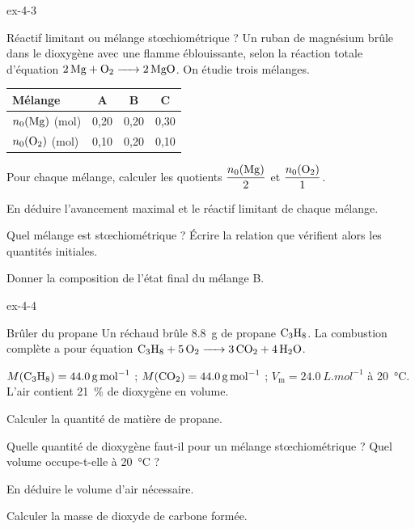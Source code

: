 \begin{blocLivre}{ex-4-3}
\begin{exercice}[1]{Réactif limitant ou mélange stœchiométrique ?}
Un ruban de magnésium brûle dans le dioxygène avec une flamme éblouissante, selon la réaction totale d'équation
$\ce{2Mg + O2 -> 2MgO}$. On étudie trois mélanges.
\par\smallskip\noindent\hfill\begin{tabular}{lccc}
\toprule
Mélange & A & B & C \\
\midrule
$n_0(\ce{Mg})$ (\unit{mol}) & 0,20 & 0,20 & 0,30 \\
$n_0(\ce{O2})$ (\unit{mol}) & 0,10 & 0,20 & 0,10 \\
\bottomrule
\end{tabular}\hfill\null\par\smallskip
\begin{questions}
\item Pour chaque mélange, calculer les quotients $\dfrac{n_0(\ce{Mg})}{2}$ et $\dfrac{n_0(\ce{O2})}{1}$.
\item En déduire l'avancement maximal et le réactif limitant de chaque mélange.
\item Quel mélange est stœchiométrique ? Écrire la relation que vérifient alors les quantités initiales.
\item Donner la composition de l'état final du mélange B.
\end{questions}
\end{exercice}
\end{blocLivre}
\begin{blocLivre}{ex-4-4}
\begin{exercice}[1]{Brûler du propane}
Un réchaud brûle \qty{8,8}{g} de propane $\ce{C3H8}$. La combustion complète a pour équation $\ce{C3H8 + 5O2 -> 3CO2 + 4H2O}$.
\begin{donnees}
$M(\ce{C3H8})=\qty{44,0}{g.mol^{-1}}$ ; $M(\ce{CO2})=\qty{44,0}{g.mol^{-1}}$ ; $V_\mathrm{m}=\qty{24,0}{L.mol^{-1}}$ à \qty{20}{\degreeCelsius}. L'air contient 21~\% de dioxygène en volume.
\end{donnees}
\begin{questions}
\item Calculer la quantité de matière de propane.
\item Quelle quantité de dioxygène faut-il pour un mélange stœchiométrique ? Quel volume occupe-t-elle à \qty{20}{\degreeCelsius} ?
\item En déduire le volume d'air nécessaire.
\item Calculer la masse de dioxyde de carbone formée.
\end{questions}
\end{exercice}
\end{blocLivre}
